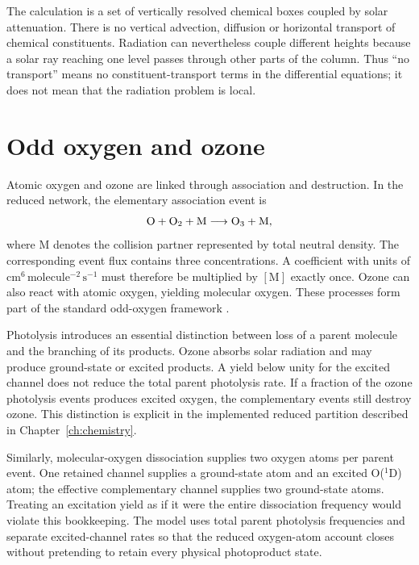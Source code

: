 The calculation is a set of vertically resolved chemical boxes coupled by solar attenuation. There is no vertical advection, diffusion or horizontal transport of chemical constituents. Radiation can nevertheless couple different heights because a solar ray reaching one level passes through other parts of the column. Thus ``no transport'' means no constituent-transport terms in the differential equations; it does not mean that the radiation problem is local.

\section{Odd oxygen and ozone}
Atomic oxygen and ozone are linked through association and destruction. In the reduced network, the elementary association event is
\begin{equation}\mathrm{O}+\mathrm{O}_2+\mathrm{M}\longrightarrow\mathrm{O}_3+\mathrm{M},\label{eq:association}\end{equation}
where $\mathrm{M}$ denotes the collision partner represented by total neutral density. The corresponding event flux contains three concentrations. A coefficient with units of $\mathrm{cm^6\,molecule^{-2}\,s^{-1}}$ must therefore be multiplied by $[\mathrm{M}]$ exactly once. Ozone can also react with atomic oxygen, yielding molecular oxygen. These processes form part of the standard odd-oxygen framework \citep{brasseur2005,jpl18}.

Photolysis introduces an essential distinction between loss of a parent molecule and the branching of its products. Ozone absorbs solar radiation and may produce ground-state or excited products. A yield below unity for the excited channel does not reduce the total parent photolysis rate. If a fraction of the ozone photolysis events produces excited oxygen, the complementary events still destroy ozone. This distinction is explicit in the implemented reduced partition described in Chapter~\ref{ch:chemistry}.

Similarly, molecular-oxygen dissociation supplies two oxygen atoms per parent event. One retained channel supplies a ground-state atom and an excited O($^1$D) atom; the effective complementary channel supplies two ground-state atoms. Treating an excitation yield as if it were the entire dissociation frequency would violate this bookkeeping. The model uses total parent photolysis frequencies and separate excited-channel rates so that the reduced oxygen-atom account closes without pretending to retain every physical photoproduct state.

